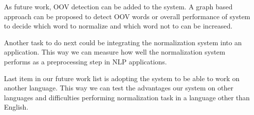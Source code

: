 \documentclass[a4paper,onesided,12pt]{report}
\begin{document}
As future work, OOV detection can be added to the system. A graph based approach can be proposed to detect OOV words or overall performance of system to decide which word to normalize and which word not to can be increased.

Another task to do next could be integrating the normalization system into an application. This way we can measure how well the normalization system performs as a preprocessing step in NLP applications.

Last item in our future work list is adopting the system to be able to work on another language. This way we can test the advantages our system on other languages and difficulties performing normalization task in a language other than English.


%


\end{document}
